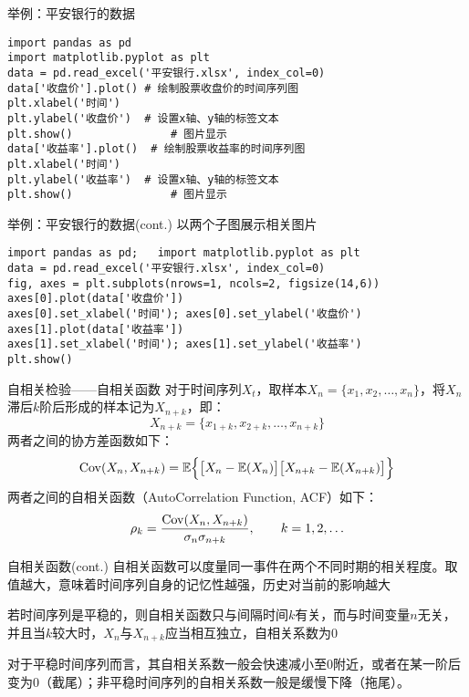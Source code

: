 \documentclass[t]{beamer}
\newcommand{\E}{\mathbb{E}}
\begin{document}
\begin{frame}[fragile]{举例：平安银行的数据}
\begin{lstlisting}
import pandas as pd
import matplotlib.pyplot as plt
data = pd.read_excel('平安银行.xlsx', index_col=0) 
data['收盘价'].plot() # 绘制股票收盘价的时间序列图
plt.xlabel('时间')
plt.ylabel('收盘价')  # 设置x轴、y轴的标签文本
plt.show()               # 图片显示
data['收益率'].plot()  # 绘制股票收益率的时间序列图
plt.xlabel('时间') 
plt.ylabel('收益率')  # 设置x轴、y轴的标签文本
plt.show()               # 图片显示
\end{lstlisting}


\end{frame}


\begin{frame}[fragile]{举例：平安银行的数据(cont.)}
以两个子图展示相关图片
\begin{lstlisting}
import pandas as pd;   import matplotlib.pyplot as plt
data = pd.read_excel('平安银行.xlsx', index_col=0) 
fig, axes = plt.subplots(nrows=1, ncols=2, figsize(14,6))
axes[0].plot(data['收盘价'])
axes[0].set_xlabel('时间'); axes[0].set_ylabel('收盘价')  
axes[1].plot(data['收益率'])  
axes[1].set_xlabel('时间'); axes[1].set_ylabel('收益率') 
plt.show()
\end{lstlisting}


\end{frame}

\begin{frame}[fragile]{自相关检验——自相关函数}
对于时间序列$X_t$，取样本$X_n=\{x_1,x_2,\ldots, x_n\}$，将$X_n$滞后$k$阶后形成的样本记为$X_{n+k}$，即：
\[X_{n+k}=\{x_{1+k},x_{2+k},\ldots, x_{n+k}\}\]
两者之间的协方差函数如下：
\[{\rm Cov}(X_n,X_{n+k})=\E\Big\{\big[X_n-\E(X_n)\big]\big[X_{n+k}-\E(X_{n+k})\big]\Big\}\]
两者之间的自相关函数（AutoCorrelation Function, ACF）如下：
\[\rho_k=\frac{{\rm Cov}(X_n,X_{n+k})}{\sigma_n \sigma_{n+k}},\qquad k=1,2,\ldots \]


\end{frame}

\begin{frame}[fragile]{自相关函数(cont.)}
    自相关函数可以度量同一事件在两个不同时期的相关程度。取值越大，意味着时间序列自身的记忆性越强，历史对当前的影响越大

    若时间序列是平稳的，则自相关函数只与间隔时间$k$有关，而与时间变量$n$无关，并且当$k$较大时，$X_n$与$X_{n+k}$应当相互独立，自相关系数为0

对于平稳时间序列而言，其自相关系数一般会快速减小至0附近，或者在某一阶后变为0（截尾）；非平稳时间序列的自相关系数一般是缓慢下降（拖尾）。
\end{frame}
\end{document}
